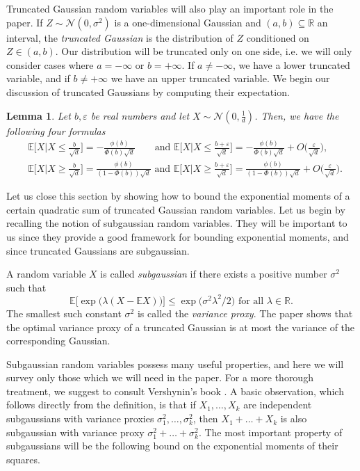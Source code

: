 \documentclass[11pt]{amsart}
\newtheorem{lemma}[theorem]{\bf Lemma}
\theoremstyle{definition}
\def\eps{\varepsilon}
\def\cN{\mathcal{N}}
\def\bE{\mathbb{E}}
\def\bR{\mathbb{R}}
\begin{document}
Truncated Gaussian random variables will also play an important role in the paper. If $Z\sim \cN(0, \sigma^2)$ is a one-dimensional Gaussian and $(a, b)\subseteq \bR$ an interval, the \textit{truncated Gaussian} is the distribution of $Z$ conditioned on $Z\in (a, b)$. Our distribution will be truncated only on one side, i.e. we will only consider cases where $a=-\infty$ or $b=+\infty$. If $a\neq -\infty$, we have a lower truncated variable, and if $b\neq+\infty$ we have an upper truncated variable. We begin our discussion of truncated Gaussians by computing their expectation.

\begin{lemma}\label{lemma:truncated_expectation}
Let $b, \eps$ be real numbers and let $X\sim \cN(0, \frac{1}{d})$. Then, we have the following four formulas
{\smaller[0.3]
\begin{align*}
    &\bE\bigg[X\Big| X\leq \frac{b}{\sqrt{d}}\bigg]=-\frac{\phi(b)}{\Phi(b)\sqrt{d}} \quad \,\,\,\,\text{ and }\bE\bigg[X\Big| X\leq \frac{b+\eps}{\sqrt{d}}\bigg]=-\frac{\phi(b)}{\Phi(b)\sqrt{d}}+O\bigg(\frac{\eps}{\sqrt{d}}\bigg),\\
    &\bE\bigg[X\Big| X\geq \frac{b}{\sqrt{d}}\bigg]=\frac{\phi(b)}{(1-\Phi(b))\sqrt{d}}\text{ and } \bE\bigg[X\Big| X\geq \frac{b+\eps}{\sqrt{d}}\bigg]=\frac{\phi(b)}{(1-\Phi(b))\sqrt{d}}+O\bigg(\frac{\eps}{\sqrt{d}}\bigg).
\end{align*}
}
\end{lemma}

Let us close this section by showing how to bound the exponential moments of a certain quadratic sum of truncated Gaussian random variables. Let us begin by recalling the notion of subgaussian random variables. They will be important to us since they provide a good framework for bounding exponential moments, and since truncated Gaussians are subgaussian.

A random variable $X$ is called \textit{subgaussian} if there exists a positive number $\sigma^2$ such that
{\smaller[0.3]
\[\bE\big[\exp\big(\lambda (X-\bE X)\big)\big]\leq \exp\big(\sigma^2\lambda^2/2\big) \text{ for all }\lambda\in \bR.\]
}
The smallest such constant $\sigma^2$ is called the \textit{variance proxy}. The paper \cite{BMA24} shows that the optimal variance proxy of a truncated Gaussian is at most the variance of the corresponding Gaussian.

Subgaussian random variables possess many useful properties, and here we will survey only those which we will need in the paper. For a more thorough treatment, we suggest to consult Vershynin's book \cite{Ver18}. A basic observation, which follows directly from the definition, is that if $X_1, \dots, X_k$ are independent subgaussians with variance proxies $\sigma_1^2, \dots, \sigma_k^2$, then $X_1+\dots+X_k$ is also subgaussian with variance proxy $\sigma_1^2+\dots+\sigma_k^2$. The most important property of subgaussians will be the following bound on the exponential moments of their squares.
\end{document}
